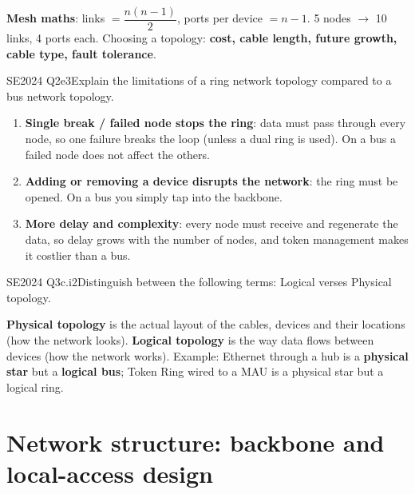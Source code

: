 \documentclass[10pt]{article}
\begin{document}
\begin{mnemonic}
\textbf{Mesh maths}: links $= \dfrac{n(n-1)}{2}$, ports per device $= n-1$. 5 nodes $\to$ 10 links, 4 ports each. \quad
Choosing a topology: \textbf{cost, cable length, future growth, cable type, fault tolerance}.
\end{mnemonic}

\begin{pastq}{SE2024 Q2e}{3}Explain the limitations of a ring network topology compared to a bus network topology.\end{pastq}
\begin{ans}
\begin{enumerate}
\item \textbf{Single break / failed node stops the ring}: data must pass through every node, so one failure breaks the loop (unless a dual ring is used). On a bus a failed node does not affect the others.
\item \textbf{Adding or removing a device disrupts the network}: the ring must be opened. On a bus you simply tap into the backbone.
\item \textbf{More delay and complexity}: every node must receive and regenerate the data, so delay grows with the number of nodes, and token management makes it costlier than a bus.
\end{enumerate}
\end{ans}

\begin{pastq}{SE2024 Q3c.i}{2}Distinguish between the following terms: Logical verses Physical topology.\end{pastq}
\begin{ans}
\textbf{Physical topology} is the actual layout of the cables, devices and their locations (how the network looks).
\textbf{Logical topology} is the way data flows between devices (how the network works).
Example: Ethernet through a hub is a \textbf{physical star} but a \textbf{logical bus}; Token Ring wired to a MAU is a physical star but a logical ring.
\end{ans}

\section{Network structure: backbone and local-access design}
\end{document}
